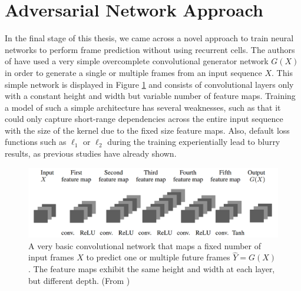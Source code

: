 \section{Adversarial Network Approach} \label{sec:related_gan}

In the final stage of this thesis, we came across a novel approach to train neural networks to perform frame prediction without using recurrent cells. The authors of \parencite{deep_multiscale_video_pred} have used a very simple overcomplete convolutional generator network $ G(X) $ in order to generate a single or multiple frames from an input sequence $ X $. This simple network is displayed in Figure \ref{fig:gan_generator} and consists of convolutional layers only with a constant height and width but variable number of feature maps. Training a model of such a simple architecture has several weaknesses, such as that it could only capture short-range dependencies across the entire input sequence with the size of the kernel due to the fixed size feature maps. Also, default loss functions such as $\ell_1$ or $\ell_2$ during the training experientially lead to blurry results, as previous studies have already shown.

\begin{figure}[htb]
	\centering
	\includegraphics[width=0.8\linewidth]{figures/related/deep_multiscale_generator.png} 
	\caption[Convolutional Autoencoder for Future Generation]{A very basic convolutional network that maps a fixed number of input frames $X$ to predict one or multiple future frames $\hat{Y} = G(X)$. The feature maps exhibit the same height and width at each layer, but different depth. (From \parencite{deep_multiscale_video_pred})} \label{fig:gan_generator}
\end{figure}

